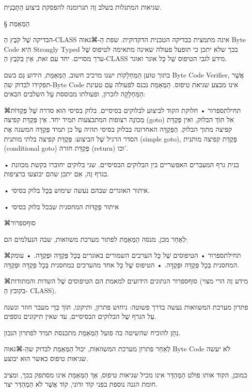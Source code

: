 שגיאות המתגלות בשלב זֶה תגרומנה להפסקת ביצוע הַתָּכְנִית.

§ הַמְּאַמֵּת

הבדיקה שֶׁל קֹבֶץ הַ-CLASS אינה מתמצית בבדיקה הטכנית הדקדוקית. שפת הַ-⌘גאוה Byte
Code הִיא Strongly Typed בכך שלא יתכן כי תופעל פעולה שאינה מתאימה לטיפוס שֶׁל
ערך מסויים. יחד עִם זאת, אֵין בְּקֹבֶץ הַ-CLASS מידע לגבי הטיפוס שֶׁל כָּל אוגר
ואוגר.

בתוך טוען הַמַּחְלָקוֹת ישנו מרכיב חשוב, הַמְּאַמֵּת, הידוע גַּם בשם Byte Code
Verifier, אֲשֶׁר תפקידו לבדוק שהַ-Byte Code אינו מבצע שגיאת טיפוס. הַמְּאַמֵּת
נכנס לפעולה עִם טעינת הַמַּחְלָקָה לזכרון, ופעולתו מבוססת עַל השלבים הבאים:

⌘תחילת{ספרור}
• חלוקת הקוד לביצוע לבלוקים בסיסיים. בלוק בסיסי הוּא סדרה שֶׁל פְּקֻדּוֹת
מְכוֹנָה רצופות המתבצעות תמיד יחד. אֵין פְּקֻדַּת קפיצה (goto) אל תּוֹךְ הבלוק,
ואין פְּקֻדַּת קפיצה מתוך הבלוק. הַפְּקֻדָּה האחרונה בבלוק בסיסי תהיה עַל כן
תמיד פְּקֻדָּה המשנה אֶת הסדר הרגיל שֶׁל הביצוע: פְּקֻדַּת קפיצה בלתי מותנית
(simple goto), פְּקֻדַּת קפיצה מותנית (conditional goto) פְּקֻדַּת חזרה
(return) וכו'.

• בנית גרף המעברים האפשריים בין הבלוקים הבסיסיים. שני בלוקים יחוברו בקשת מכוונת
בגרף זֶה, אִם יתכן שהם יבוצעו ברציפות.

• איתור האוגרים שבהם נעשה שימוש בְּכָל בלוק בסיסי.

• איתור פְּקֻדּוֹת המחסנית שבכל בלוק בסיסי

⌘סוף{ספרור}

לְאַחַר מכן, מנסה הַמְּאַמֵּת לפתור מערכת משוואות, שבה הנעלמים הם:

⌘תחילת{ספרור}
• הטיפוסים שֶׁל כָּל הערכים השמורים באוגרים בְּכָל פְּקֻדָּה וּפְקֻדָּה.
• עומק המחסנית בְּכָל פְּקֻדָּה וּפְקֻדָּה.
• הטיפוס שֶׁל כָּל אחד מהערכים במחסנית בְּכָל פְּקֻדָּה וּפְקֻדָּה.

⌘סוף{ספרור}
הנתונים הידועים למאמת הם הטיפוסים שֶׁל השדות והמתודות (מידע זֶה הרי מצוי בקובץ
הַ- CLASS).

פתרון מערכת המשוואות נעשה בדרך פשוטה: ניחוש פתרון, ותיקונו, תּוֹךְ כְּדֵי מעבר
חוזר ונשנה עַל הגרף שֶׁל הבלוקים הבסיסיים, עד שאין תיקונים נוספים.

נִתָּן להוכיח שהשיטה בה פועל הַמְּאַמֵּת מתכנסת תמיד לפתרון הנכון.

לְאַחַר פתרון מערכת המשוואות, יכול הַמְּאַמֵּת לבדוק שהַ-⌘גאוה Byte Code לֹא יעשה
שגיאות טיפוס כאשר הוּא יבוצע.

כמובן, הקוד אותו פולט הַמְּהַדֵּר אינו מכיל שגיאות טיפוס, אַךְ הַמְּאַמֵּת אינו
מסתפק בכך, ומציב חומת הגנה נוספת בפני קוֹד זדוני, קוֹד אֲשֶׁר לֹא הַמְהַדֵּר
יצר.


